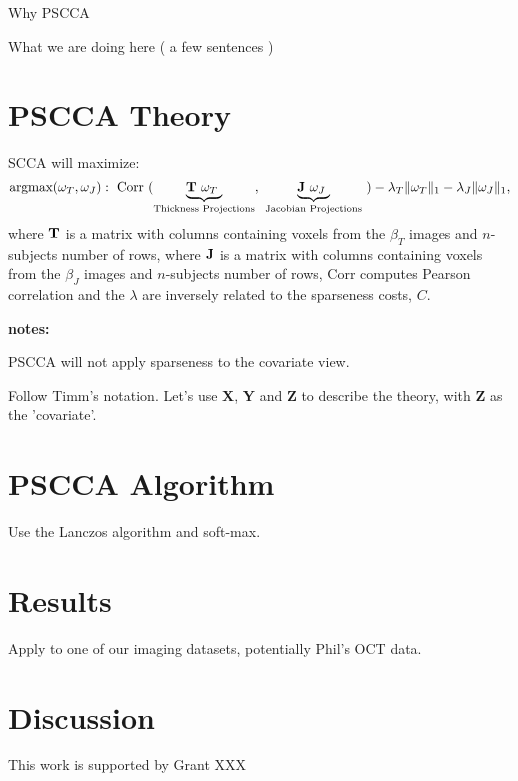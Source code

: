 \documentclass{llncs}
\begin{document}
Why PSCCA

What we are doing here ( a few sentences )

\section{PSCCA Theory}
SCCA will maximize:
\begin{equation}
\text{argmax}( \omega_T,\omega_{J}) :
 ~\text{Corr}~(\underbrace{  {\bf T} ~\omega_T~}_{\text{Thickness Projections}} ,~\underbrace{ {\bf J} ~\omega_{J}~}_{\text{Jacobian Projections}}~) - \lambda_T \| \omega_T \|_1 - \lambda_J \|  \omega_{J}  \|_1 , 
\end{equation} 
where ${\bf T}$ is a matrix with columns containing voxels from the $\beta_T$ images and $n$-subjects number of rows, 
where ${\bf J}$ is a matrix with columns containing voxels from the $\beta_J$ images and $n$-subjects number of rows, 
 Corr computes Pearson correlation and the
$\lambda$ are inversely related to the sparseness costs, $C$.  %

{\bf notes:}

PSCCA will not apply sparseness to the covariate view.  

Follow Timm's notation.  Let's use {\bf  X}, {\bf Y} and {\bf Z} to describe the theory, with {\bf Z} as the
'covariate'.   

\section{PSCCA Algorithm}
Use the Lanczos algorithm and soft-max.

\section{Results}
Apply to one of our imaging datasets, potentially Phil's OCT data.

\section{Discussion}

 This work is supported by Grant XXX 


\end{document}
